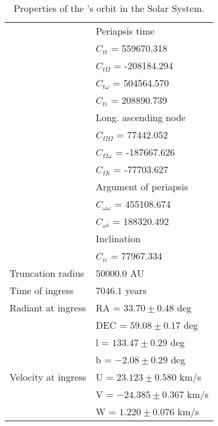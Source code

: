 \begin{table}
\begin{tabular}{ll}
                      & Periapsis time \\
                      & $C_{tt}$ = 559670.318\\
                      & $C_{t\Omega}$ = -208184.294\\
                      & $C_{t\omega}$ = 504564.570\\
                      & $C_{ti}$ = 208890.739\\

                      & Long. ascending node \\
                      & $C_{\Omega\Omega}$ = 77442.052\\
                      & $C_{\Omega\omega}$ = -187667.626\\
                      & $C_{\Omega i}$ = -77703.627\\

                      & Argument of periapsis\\
                      & $C_{\omega\omega}$ = 455108.674\\
                      & $C_{\omega i}$ = 188320.492\\

                      & Inclination\\
                      & $C_{ii}$ = 77967.334\\

  Truncation radius & $50000.0$ AU \\
  Time of ingress & $7046.1$ years \\
  Radiant at ingress & RA = $33.70\pm 0.48$ deg\\
                     & DEC = $59.08\pm 0.17$ deg \\
                     & l =  $133.47\pm 0.29$ deg \\
                     & b = $-2.08\pm 0.29$ deg \\
  Velocity at ingress & U = $23.123\pm 0.580$ km/s\\
                      & V = $-24.385\pm 0.367$ km/s\\
                      & W = $1.220\pm 0.076$ km/s\\\hline
  \end{tabular}
\caption{Properties of the \Borisov's orbit in the Solar System.\label{tab:AsymptoticElements}}
\end{table}
